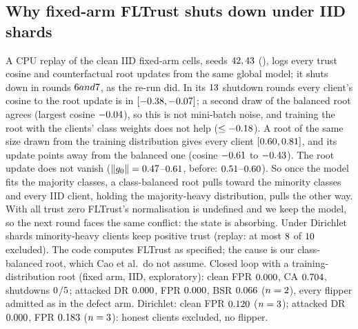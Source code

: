 \documentclass[journal]{IEEEtran}
\begin{document}
\subsection{Why fixed-arm FLTrust shuts down under IID shards}
\label{sup:fltshut}
A CPU replay of the clean IID fixed-arm cells, seeds $42, 43$
(), logs every trust cosine and counterfactual
root updates from the same global model; it shuts down in rounds $6 and 7$,
as the re-run did. In its $13$ shutdown rounds every client's cosine to the root
update is in $[-0.38,-0.07]$; a second draw of the balanced root agrees
(largest cosine $-0.04$), so this is not mini-batch noise, and training the
root with the clients' class weights does not help ($\le-0.18$). A root of
the same size drawn from the training distribution gives every client
$[0.60,0.81]$, and its update points away from the balanced one
(cosine $-0.61$ to $-0.43$). The root update does not vanish
($\|g_0\|=0.47$--$0.61$, before: $0.51$--$0.60$).
So once the model fits the majority classes, a class-balanced
root pulls toward the minority classes and every IID client, holding the
majority-heavy distribution, pulls the other way. With all trust zero FLTrust's
normalisation is undefined and we keep the model, so the next round faces the same
conflict: the state is absorbing. Under Dirichlet shards minority-heavy clients keep
positive trust (replay: at most $8$ of $10$ excluded). The code computes FLTrust as specified; the cause is our
class-balanced root, which Cao et al.\ do not assume. Closed loop with a
training-distribution root (fixed arm, IID, exploratory): clean FPR
$0.000$, CA $0.704$, shutdowns $0$/$5$;
attacked DR $0.000$, FPR $0.000$, BSR $0.066$ ($n=2$),
every flipper admitted as in the defect arm. Dirichlet:
clean FPR $0.120$ ($n=3$); attacked DR $0.000$, FPR $0.183$
($n=3$): honest clients excluded, no flipper.
\end{document}
